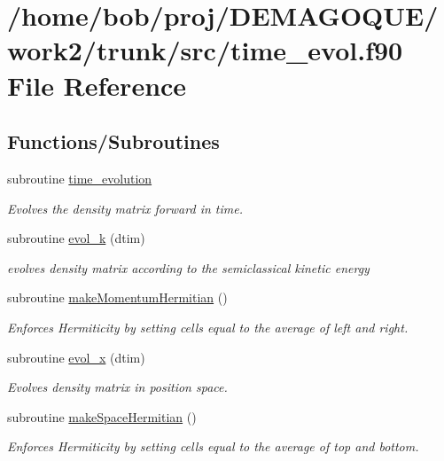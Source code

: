 \hypertarget{time__evol_8f90}{
\section{/home/bob/proj/DEMAGOQUE/work2/trunk/src/time\_\-evol.f90 File Reference}
\label{time__evol_8f90}
}
\subsection*{Functions/Subroutines}
\begin{DoxyCompactItemize}
\item 
subroutine \hyperlink{time__evol_8f90_a10534c39878a0b190f230860a356df23}{time\_\-evolution}
\begin{DoxyCompactList}\small\item\em Evolves the density matrix forward in time. \item\end{DoxyCompactList}\item 
subroutine \hyperlink{time__evol_8f90_af0e783dddfdffb3dd9ed939b2e22cfeb}{evol\_\-k} (dtim)
\begin{DoxyCompactList}\small\item\em evolves density matrix according to the semiclassical kinetic energy \item\end{DoxyCompactList}\item 
subroutine \hyperlink{time__evol_8f90_aae7967c421ef278652e75095f5c0473d}{makeMomentumHermitian} ()
\begin{DoxyCompactList}\small\item\em Enforces Hermiticity by setting cells equal to the average of left and right. \item\end{DoxyCompactList}\item 
subroutine \hyperlink{time__evol_8f90_a3b0f1dd129befe0c02108523072801e3}{evol\_\-x} (dtim)
\begin{DoxyCompactList}\small\item\em Evolves density matrix in position space. \item\end{DoxyCompactList}\item 
subroutine \hyperlink{time__evol_8f90_a514c7ebdcf00ccbc5b02c9de9c20968c}{makeSpaceHermitian} ()
\begin{DoxyCompactList}\small\item\em Enforces Hermiticity by setting cells equal to the average of top and bottom. \item\end{DoxyCompactList}\item 

\end{DoxyCompactItemize}
